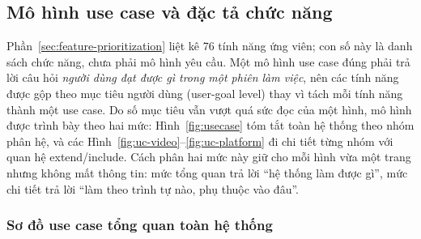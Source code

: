 \subsection{Mô hình use case và đặc tả chức năng}
\label{sec:use-case-model}

Phần~\ref{sec:feature-prioritization} liệt kê 76 tính năng ứng viên; con số này là danh sách chức năng, chưa phải mô hình yêu cầu. Một mô hình use case đúng phải trả lời câu hỏi \emph{người dùng đạt được gì trong một phiên làm việc}, nên các tính năng được gộp theo mục tiêu người dùng (user-goal level) thay vì tách mỗi tính năng thành một use case. Do số mục tiêu vẫn vượt quá sức đọc của một hình, mô hình được trình bày theo hai mức: Hình~\ref{fig:usecase} tóm tắt toàn hệ thống theo nhóm phân hệ, và các Hình~\ref{fig:uc-video}--\ref{fig:uc-platform} đi chi tiết từng nhóm với quan hệ \guillemotleft extend\guillemotright/\guillemotleft include\guillemotright. Cách phân hai mức này giữ cho mỗi hình vừa một trang nhưng không mất thông tin: mức tổng quan trả lời ``hệ thống làm được gì'', mức chi tiết trả lời ``làm theo trình tự nào, phụ thuộc vào đâu''.

\subsubsection{Sơ đồ use case tổng quan toàn hệ thống}
\label{sec:uc-overview}

